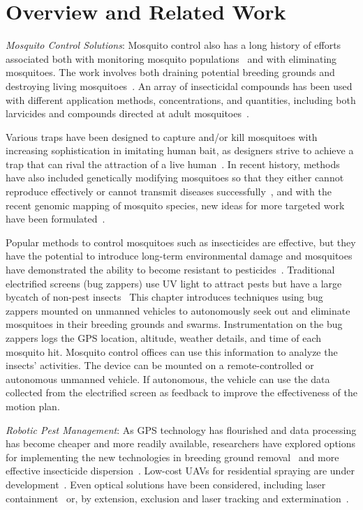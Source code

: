 \section[RelatedWork]{Overview and Related Work}

\noindent  \emph{Mosquito Control Solutions}:
Mosquito control also has a long history of efforts associated both with monitoring mosquito populations~\cite{dennett2007associations} and with eliminating mosquitoes.
The work involves both draining potential breeding grounds and destroying living mosquitoes~\cite{peter2005tick}.
An array of insecticidal compounds has been used with different application methods, concentrations, and quantities, including both larvicides and compounds directed at adult mosquitoes~\cite{larvicides2005guidelines}.

Various traps have been designed to capture and/or kill mosquitoes with increasing sophistication in imitating human bait, as designers strive to achieve a trap that can rival the attraction of a live human~\cite{maliti2015development}.
In recent history, methods have also included genetically modifying mosquitoes so that they either cannot reproduce effectively or cannot transmit diseases successfully~\cite{marshall2009malaria}, and with the recent genomic mapping of mosquito species, new ideas for more targeted work have been formulated~\cite{hill2005arthropod}.

Popular methods to control mosquitoes such as insecticides are effective, but they have the potential to introduce long-term environmental damage and mosquitoes have demonstrated the ability to become resistant to pesticides~\cite{ndiath2012resistance}.
Traditional electrified screens (bug zappers) use UV light to attract pests but have a large bycatch of non-pest insects~\cite{University-Of-Florida1997}
This chapter introduces techniques using bug zappers mounted on unmanned vehicles to autonomously seek out and eliminate mosquitoes in their breeding grounds and swarms.
Instrumentation on the bug zappers logs the GPS location, altitude, weather details, and time of each mosquito hit.
Mosquito control offices can use this information to analyze the insects' activities.
The device can be mounted on a remote-controlled or autonomous unmanned vehicle.
If autonomous, the vehicle can use the data collected from the electrified screen as feedback to improve the effectiveness of the motion plan. 
	
\noindent  \emph{Robotic Pest Management}:
As GPS technology has flourished and data processing has become cheaper and more readily available, researchers have explored options for implementing the new technologies in breeding ground removal~\cite{anupa2014identification} and more effective insecticide dispersion~\cite{hur2015low}.  Low-cost UAVs for residential spraying are under development~\cite{amenyo2014medizdroids}.  Even optical solutions have been considered, including laser containment~\cite{boonsri2012laser} or, by extension, exclusion and laser tracking and extermination~\cite{kare2010build}.
    
